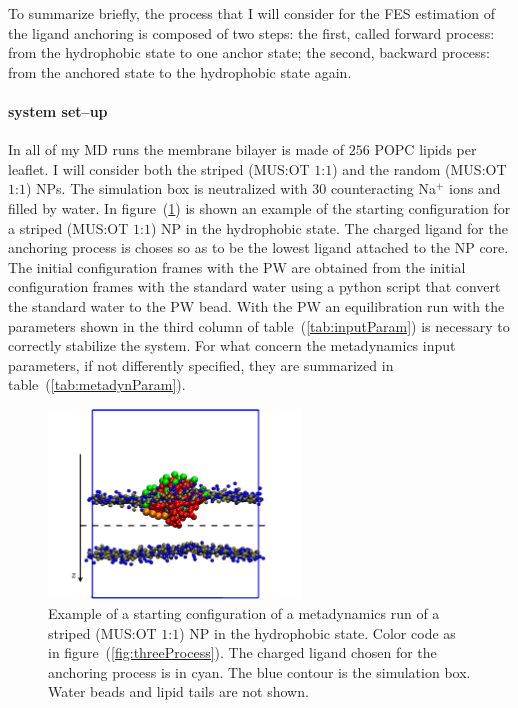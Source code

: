 To summarize briefly, the process that I will consider for the \ac{FES} estimation of the ligand anchoring is composed of two steps: the first, called forward process: from the hydrophobic state to one anchor state; the second, backward process: from the anchored state to the hydrophobic state again. 

\paragraph{\textbf{system set--up}} In all of my \ac{MD} runs the membrane bilayer is made of $256$ \ac{POPC} lipids per leaflet. I will consider both the striped (\ac{MUS}:\ac{OT} $1$:$1$) and the random (\ac{MUS}:\ac{OT} $1$:$1$) \acp{NP}. The simulation box is neutralized with $30$ counteracting Na$^+$ ions and filled by water. In figure~(\ref{fig:startFrameEx}) is shown an example of the starting configuration for a striped (\ac{MUS}:\ac{OT} $1$:$1$) \ac{NP} in the hydrophobic state. The charged ligand for the anchoring process is choses so as to be the lowest ligand attached to the \ac{NP} core. The initial configuration frames with the \ac{PW} are obtained from the initial configuration frames with the standard \martini water using a python script that convert the standard \martini water to the \ac{PW} bead. With the \ac{PW} an equilibration run with the parameters shown in the third column of table~(\ref{tab:inputParam}) is necessary to correctly stabilize the system. For what concern the metadynamics input parameters, if not differently specified, they are summarized in table~(\ref{tab:metadynParam}).
\begin{figure}
	\centering
	\includegraphics[width=0.6\textwidth]{./img/patchedHydrophobic}
	\caption{Example of a starting configuration of a metadynamics run of a striped (\ac{MUS}:\ac{OT} $1$:$1$) \ac{NP} in the hydrophobic state. Color code as in figure~(\ref{fig:threeProcess}). The charged ligand chosen for the anchoring process is in cyan. The blue contour is the simulation box. Water beads and lipid tails are not shown.}
	\label{fig:startFrameEx}
\end{figure}

